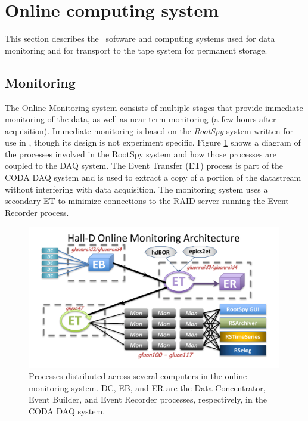 
\section[Online computing system]{Online computing system \label{sec:online}}

This section describes the \GX ~software and computing systems  used for data monitoring and for transport to the tape system for permanent storage.

\subsection{Monitoring \label{sec:onlinemonitoring}}

The Online Monitoring system consists of multiple stages that provide immediate monitoring of the data, as well as near-term monitoring (a few hours after acquisition). Immediate monitoring is based on the \textit{RootSpy} system\cite{rootspy} written for use in \GX, though its design is not experiment specific. Figure \ref{fig:online_monitoring_processes} shows a diagram of the processes involved in the RootSpy system and how those processes are coupled to the DAQ system. The Event Transfer (ET) process is part of the CODA DAQ system \cite{coda} and is used to extract a copy of a portion of the datastream without interfering with data acquisition. The monitoring system uses a secondary ET to minimize connections to the RAID server running the Event Recorder process.

\begin{figure}[tbp]
\begin{center}
\includegraphics[width=0.99\textwidth, clip,trim=1.5cm 0.9cm 1.7cm 0.8cm]{figures/online_monitoring_processes.pdf}
\caption{\label{fig:online_monitoring_processes}Processes distributed across several computers in the online monitoring system. DC, EB, and ER are the Data Concentrator, Event Builder, and Event Recorder processes, respectively, in the CODA DAQ system.}   
\end{center}  
\end{figure}

